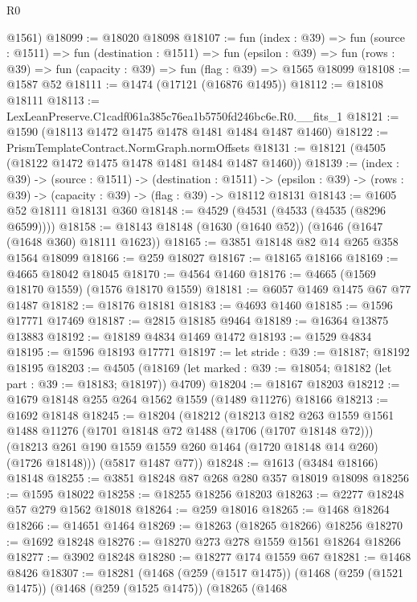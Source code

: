 \begin{lexlean}{R0}
\begin{coremodule}
      @1561)
@18099 := @18020 @18098
@18107 := fun (index : @39) =>
  fun (source : @1511) =>
  fun (destination : @1511) =>
  fun (epsilon : @39) =>
  fun (rows : @39) => fun (capacity : @39) => fun (flag : @39) => @1565 @18099
@18108 := @1587 @52
@18111 := @1474 (@17121 (@16876 @1495))
@18112 := @18108 @18111
@18113 := LexLeanPreserve.C1cadf061a385c76ea1b5750fd246bc6e.R0.__fits_1
@18121 := @1590 (@18113 @1472 @1475 @1478 @1481 @1484 @1487 @1460)
@18122 := PrismTemplateContract.NormGraph.normOffsets
@18131 := @18121 (@4505 (@18122 @1472 @1475 @1478 @1481 @1484 @1487 @1460))
@18139 := (index : @39) ->
  (source : @1511) ->
  (destination : @1511) ->
  (epsilon : @39) -> (rows : @39) -> (capacity : @39) -> (flag : @39) -> @18112 @18131
@18143 := @1605 @52 @18111 @18131 @360
@18148 := @4529 (@4531 (@4533 (@4535 (@8296 @6599))))
@18158 := @18143 @18148 (@1630 (@1640 @52)) (@1646 (@1647 (@1648 @360) @18111 @1623))
@18165 := @3851 @18148 @82 @14 @265 @358 @1564 @18099
@18166 := @259 @18027
@18167 := @18165 @18166
@18169 := @4665 @18042 @18045
@18170 := @4564 @1460
@18176 := @4665 (@1569 @18170 @1559) (@1576 @18170 @1559)
@18181 := @6057 @1469 @1475 @67 @77 @1487
@18182 := @18176 @18181
@18183 := @4693 @1460
@18185 := @1596 @17771 @17469
@18187 := @2815 @18185 @9464
@18189 := @16364 @13875 @13883
@18192 := @18189 @4834 @1469 @1472
@18193 := @1529 @4834
@18195 := @1596 @18193 @17771
@18197 := let stride : @39 := @18187; @18192 @18195
@18203 := @4505
    (@18169 (let marked : @39 := @18054; @18182 (let part : @39 := @18183; @18197)) @4709)
@18204 := @18167 @18203
@18212 := @1679 @18148 @255 @264 @1562 @1559 (@1489 @11276) @18166
@18213 := @1692 @18148
@18245 := @18204
    (@18212
      (@18213
        @182
        @263
        @1559
        @1561
        @1488
        @11276
        (@1701 @18148 @72 @1488 (@1706 (@1707 @18148 @72)))
        (@18213 @261 @190 @1559 @1559 @260 @1464 (@1720 @18148 @14 @260) (@1726 @18148)))
      (@5817 @1487 @77))
@18248 := @1613 (@3484 @18166) @18148
@18255 := @3851 @18248 @87 @268 @280 @357 @18019 @18098
@18256 := @1595 @18022
@18258 := @18255 @18256 @18203
@18263 := @2277 @18248 @57 @279 @1562 @18018
@18264 := @259 @18016
@18265 := @1468 @18264
@18266 := @14651 @1464
@18269 := @18263 (@18265 @18266) @18256
@18270 := @1692 @18248
@18276 := @18270 @273 @278 @1559 @1561 @18264 @18266
@18277 := @3902 @18248
@18280 := @18277 @174 @1559 @67
@18281 := @1468 @8426
@18307 := @18281
    (@1468
      (@259 (@1517 @1475))
      (@1468
        (@259 (@1521 @1475))
        (@1468
          (@259 (@1525 @1475))
          (@18265
            (@1468

\end{coremodule}
\end{lexlean}
